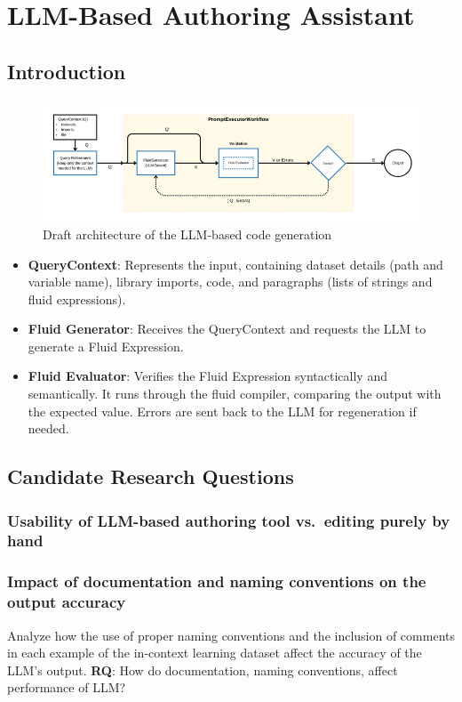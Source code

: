 \section{LLM-Based Authoring Assistant}

\subsection{Introduction}

\begin{figure}
    \centering
    \includegraphics[width=0.95\linewidth]{fig/authoring-assistant-architecture.png}
    \caption{Draft architecture of the LLM-based code generation}
    \label{fig:authoring-assistant-architecture}
\end{figure}

\begin{itemize}
    \item \textbf{QueryContext}: Represents the input, containing dataset details (path and variable name), library imports, code, and paragraphs (lists of strings and fluid expressions).
    \item \textbf{Fluid Generator}: Receives the QueryContext and requests the LLM to generate a Fluid Expression.
    \item \textbf{Fluid Evaluator}: Verifies the Fluid Expression syntactically and semantically. It runs through the fluid compiler, comparing the output with the expected value. Errors are sent back to the LLM for regeneration if needed.
\end{itemize}

\subsection{Candidate Research Questions}

\subsubsection{Usability of LLM-based authoring tool vs.~editing purely by hand}

\subsubsection{Impact of documentation and naming conventions on the output accuracy}
Analyze how the use of proper naming conventions and the inclusion of comments in each example of the
in-context learning dataset affect the accuracy of the LLM's output. \textbf{RQ}: How do documentation, naming
conventions, affect performance of LLM?

